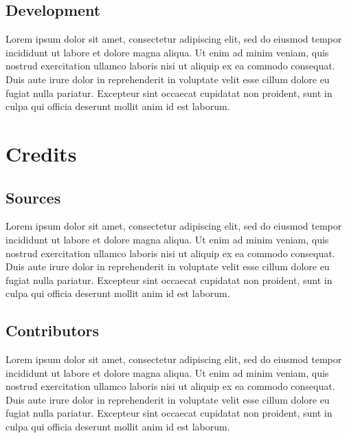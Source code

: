 \documentclass{article}
\newcommand\tab[1][1cm]{\hspace*{#1}}
\begin{document}
\subsection{Development}

\tab Lorem ipsum dolor sit amet, consectetur adipiscing elit, sed do eiusmod tempor incididunt ut labore et dolore magna aliqua. Ut enim ad minim veniam, quis nostrud exercitation ullamco laboris nisi ut aliquip ex ea commodo consequat. Duis aute irure dolor in reprehenderit in voluptate velit esse cillum dolore eu fugiat nulla pariatur. Excepteur sint occaecat cupidatat non proident, sunt in culpa qui officia deserunt mollit anim id est laborum.


\section{Credits}
\subsection{Sources}

\tab Lorem ipsum dolor sit amet, consectetur adipiscing elit, sed do eiusmod tempor incididunt ut labore et dolore magna aliqua. Ut enim ad minim veniam, quis nostrud exercitation ullamco laboris nisi ut aliquip ex ea commodo consequat. Duis aute irure dolor in reprehenderit in voluptate velit esse cillum dolore eu fugiat nulla pariatur. Excepteur sint occaecat cupidatat non proident, sunt in culpa qui officia deserunt mollit anim id est laborum.

\subsection{Contributors}

\tab Lorem ipsum dolor sit amet, consectetur adipiscing elit, sed do eiusmod tempor incididunt ut labore et dolore magna aliqua. Ut enim ad minim veniam, quis nostrud exercitation ullamco laboris nisi ut aliquip ex ea commodo consequat. Duis aute irure dolor in reprehenderit in voluptate velit esse cillum dolore eu fugiat nulla pariatur. Excepteur sint occaecat cupidatat non proident, sunt in culpa qui officia deserunt mollit anim id est laborum.
\end{document}
